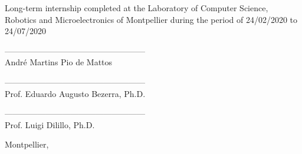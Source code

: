 \vspace{0.5cm}

\begin{center}
    Long-term internship completed at the Laboratory of Computer Science, Robotics and Microelectronics of Montpellier during the period of 24/02/2020 to 24/07/2020
\end{center}

\vspace{0.5cm}

\begin{center}
    --------------------------------------------------- \\
    André Martins Pio de Mattos \\
\end{center}

\vspace{0.1cm}

\begin{center}
    --------------------------------------------------- \\
    Prof. Eduardo Augusto Bezerra, Ph.D. \\
\end{center}

\vspace{0.1cm}

\begin{center}
    --------------------------------------------------- \\
    Prof. Luigi Dilillo, Ph.D. \\
\end{center}
   
    
\vspace{1cm}

\begin{center}
    Montpellier, \the\year
\end{center}
    
